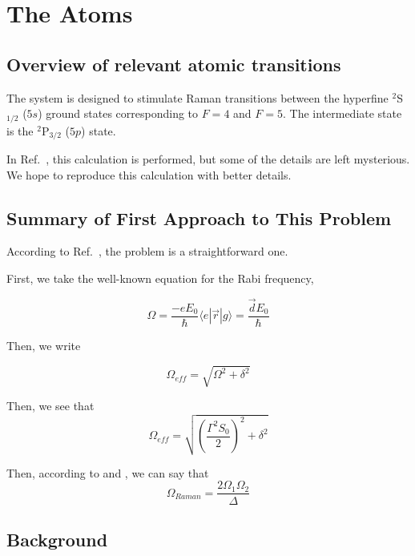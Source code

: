 \chapter{The Atoms} \label{ChapterAboutTheAtoms}
\section{Overview of relevant atomic transitions}

The system is designed to stimulate Raman transitions between the hyperfine $^2$S$_{1/2}$ ($5s$) ground states corresponding to $F=4$ and $F=5$. The intermediate state is the $^2$P$_{3/2}$ ($5p$) state. 

In Ref.\ \cite{cjeDiss}, this calculation is performed, but some of the details are left mysterious. We hope to reproduce this calculation with better details.  

\section{Summary of First Approach to This Problem}

According to Ref.\ \cite{cjeDiss}, the problem is a straightforward one.

First, we take the well-known equation for the Rabi frequency, 

\begin{equation}
\Omega = \frac{-eE_0}{\hbar}\langle e |\vec{r}|g\rangle=\frac{\vec{d}E_0}{\hbar}
\end{equation}

Then, we write 

\begin{equation}
\Omega_\mathit{eff}=\sqrt{\Omega^2+\delta^2}
\end{equation}

Then, we see that 
\begin{equation}
\Omega_\mathit{eff}=\sqrt{\left(\frac{\Gamma^2S_0}{2}\right)^2 + \delta^2}
\end{equation}

Then, according to \cite{RamanBeamSplit} and \cite{footAtomicPhysics}, we can say that 
\begin{equation} \label{KorsunskysJewel}
\Omega_\mathit{Raman}=\frac{2\Omega_1\Omega_2}{\Delta}
\end{equation}

\section{Background}


